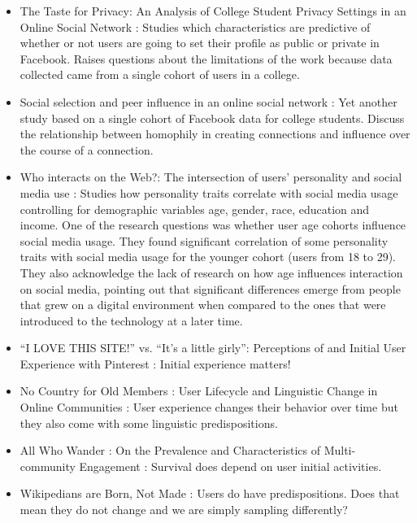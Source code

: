 \begin{itemize}
    \item The Taste for Privacy: An Analysis of College Student Privacy Settings in an Online Social Network \cite{Lewis2008}: Studies which characteristics are predictive of whether or not users are going to set their profile as public or private in Facebook. Raises questions about the limitations of the work because data collected came from a single cohort of users in a college.

    \item Social selection and peer influence in an online social network \cite{Lewis2012a}: Yet another study based on a single cohort of Facebook data for college students. Discuss the relationship between homophily in creating connections and influence over the course of a connection.

    \item Who interacts on the Web?: The intersection of users' personality and social media use \cite{Correa2010}: Studies how personality traits correlate with social media usage controlling for demographic variables age, gender, race, education and income. One of the research questions was whether user age cohorts influence social media usage. They found significant correlation of some personality traits with social media usage for the younger cohort (users from 18 to 29). They also acknowledge the lack of research on how age influences interaction on social media, pointing out that significant differences emerge from people that grew on a digital environment when compared to the ones that were introduced to the technology at a later time.

    \item ``I LOVE THIS SITE!'' vs. ``It's a little girly'': Perceptions of and Initial User Experience with Pinterest \cite{Miller2015}: Initial experience matters! 

    \item No Country for Old Members : User Lifecycle and Linguistic Change in Online Communities \cite{Danescu-niculescu-mizil2013}: User experience changes their behavior over time but they also come with some linguistic predispositions.

    \item All Who Wander : On the Prevalence and Characteristics of Multi-community Engagement \cite{Tan2015}: Survival does depend on user initial activities.

    \item Wikipedians are Born, Not Made \cite{Panciera2009}: Users do have predispositions. Does that mean they do not change and we are simply sampling differently?


\end{itemize}

